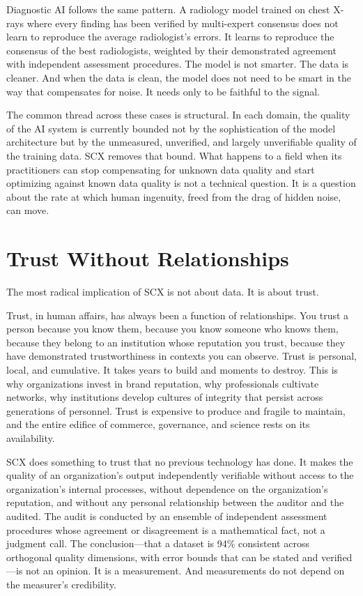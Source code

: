 \documentclass[12pt,a4paper]{article}
\begin{document}
Diagnostic AI follows the same pattern. A radiology model trained on chest X-rays where every finding has been verified by multi-expert consensus does not learn to reproduce the average radiologist's errors. It learns to reproduce the consensus of the best radiologists, weighted by their demonstrated agreement with independent assessment procedures. The model is not smarter. The data is cleaner. And when the data is clean, the model does not need to be smart in the way that compensates for noise. It needs only to be faithful to the signal.

The common thread across these cases is structural. In each domain, the quality of the AI system is currently bounded not by the sophistication of the model architecture but by the unmeasured, unverified, and largely unverifiable quality of the training data. SCX removes that bound. What happens to a field when its practitioners can stop compensating for unknown data quality and start optimizing against known data quality is not a technical question. It is a question about the rate at which human ingenuity, freed from the drag of hidden noise, can move.

\section{Trust Without Relationships}

The most radical implication of SCX is not about data. It is about trust.

Trust, in human affairs, has always been a function of relationships. You trust a person because you know them, because you know someone who knows them, because they belong to an institution whose reputation you trust, because they have demonstrated trustworthiness in contexts you can observe. Trust is personal, local, and cumulative. It takes years to build and moments to destroy. This is why organizations invest in brand reputation, why professionals cultivate networks, why institutions develop cultures of integrity that persist across generations of personnel. Trust is expensive to produce and fragile to maintain, and the entire edifice of commerce, governance, and science rests on its availability.

SCX does something to trust that no previous technology has done. It makes the quality of an organization's output independently verifiable without access to the organization's internal processes, without dependence on the organization's reputation, and without any personal relationship between the auditor and the audited. The audit is conducted by an ensemble of independent assessment procedures whose agreement or disagreement is a mathematical fact, not a judgment call. The conclusion---that a dataset is 94\% consistent across orthogonal quality dimensions, with error bounds that can be stated and verified---is not an opinion. It is a measurement. And measurements do not depend on the measurer's credibility.
\end{document}
